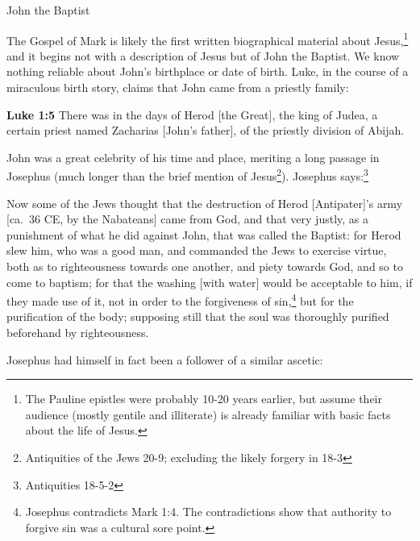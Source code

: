 \documentclass[10pt,a5paper,twoside]{article}
\newcommand{\quotesize}{\normalsize{}}
\newcommand{\comm}[1]{\begingroup \color{black!50} #1\endgroup}
\newenvironment{quotetext}{\begingroup\quotesize}{\endgroup}
\newcommand{\intex}[1]{\index[texts]{#1}}
\newcommand{\bible}[2]{\begin{quotetext}\textbf{#1}\intex{#1} #2\end{quotetext}}
\newcommand{\luke}[2]{\bible{Luke #1}{#2}}
\begin{document}
\begin{section}{John the Baptist}

\comm{The Gospel of Mark is likely the first written biographical material about Jesus,\footnote{The Pauline epistles were probably 10-20 years
earlier, but assume their audience (mostly gentile and illiterate) is already familiar with basic facts about the life of Jesus.}
and it begins not with a description of Jesus but of John the Baptist.
We know nothing reliable about John's birthplace or date of birth. Luke, in the course of a miraculous birth story, claims that
John came from a priestly family:}

\luke{1:5}{There was in the days of Herod [the Great], the king of Judea, a certain priest named Zacharias [John's father], of the priestly division of Abijah.}

\comm{
John was a great celebrity of his time and place, meriting a long passage in
Josephus (much longer than the brief mention of Jesus\footnote{Antiquities of the Jews 20-9;
excluding the likely forgery in 18-3}). 
Josephus says:\footnote{Antiquities 18-5-2} %
}

\begin{quotetext}\label{josephus-baptism}
Now some of the Jews thought that the destruction of Herod [Antipater]'s army [ca.~36 CE, by the Nabateans] came
from God, and that very justly, as a punishment of what he did against
John, that was called the Baptist: for Herod slew him, who was a good
man, and commanded the Jews to exercise virtue, both as to
righteousness towards one another, and piety towards God, and so to
come to baptism; for that the washing [with water] would be acceptable
to him, if they made use of it, not in order to the forgiveness of sin,\footnote{Josephus contradicts Mark 1:4.
The contradictions show that authority to forgive sin was a cultural sore point.}
but for the purification of the body; supposing still that the soul was thoroughly purified beforehand
by righteousness.\label{josephus-forgiveness}
\end{quotetext}

\comm{
Josephus had himself in fact been a follower of a similar ascetic:
}


\end{section}
\end{document}

